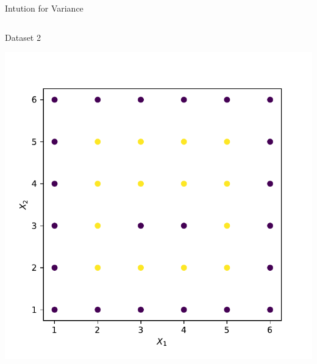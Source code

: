 \documentclass{beamer}
\begin{document}
\begin{frame}{Intution for Variance}
\begin{columns}
\begin{column}{0.5\textwidth}{\hspace{1.75cm} Dataset 2}
\begin{center}
\includegraphics[width = \textwidth]{bias-variance/imgs/dataset-2-train-var}
\end{center}
\end{column}
\end{columns}
\end{frame}
\end{document}

